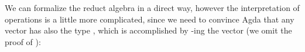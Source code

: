 We can formalize the reduct algebra in a direct way, however the
interpretation of operations is a little more complicated, since we
need to convince Agda that any vector
\AgdaSpace{}\AgdaSymbol{:}%
\AgdaSpace{}\AgdaSpace{}\AgdaSymbol{(}\AgdaSpace{}%
\AgdaUnderscore{}\AgdaSpace{}%
\AgdaSymbol{)} has also
the type \AgdaSpace{}\AgdaSymbol{(}\AgdaSpace{}%
\AgdaSpace{}\AgdaSymbol{)}, which is accomplished by
-ing the vector (we omit the proof of ):
\begin{code}
\>[0]\AgdaSpace{}%
\AgdaSpace{}%
\AgdaSymbol{\{}\AgdaSpace{}%
\AgdaSymbol{\}}\AgdaSpace{}%
\AgdaSymbol{(}\AgdaSpace{}%
\AgdaSymbol{:}\AgdaSpace{}%
\AgdaSpace{}%
\AgdaSpace{}%
\AgdaSymbol{)}\AgdaSpace{}%
\<%
%
\\
\\[\AgdaEmptyExtraSkip]%
%
\>[2]\AgdaSpace{}%
\AgdaSymbol{:}\AgdaSpace{}%
%
\>[13]\AgdaSymbol{(}\AgdaSpace{}%
\AgdaSymbol{:}\AgdaSpace{}%
\AgdaSpace{}%
\AgdaSymbol{)}\AgdaSpace{}%
\AgdaSpace{}%
\AgdaSymbol{(}\AgdaSpace{}%
\AgdaSymbol{:}\AgdaSpace{}%
\AgdaSpace{}%
\AgdaSymbol{)}\AgdaSpace{}%
\AgdaSpace{}%
\AgdaSpace{}%
\AgdaSymbol{\AgdaUnderscore{}}\AgdaSpace{}%
\AgdaSymbol{\AgdaUnderscore{}}\<%
\\
%
\>[2]\AgdaSpace{}%
\AgdaSpace{}%
\AgdaSpace{}%
\AgdaSpace{}%
\AgdaSymbol{=}\AgdaSpace{}%
\AgdaSpace{}%
\AgdaSpace{}%
\AgdaSpace{}%
\AgdaSpace{}%
\AgdaSpace{}%
\<%
%
\\[\AgdaEmptyExtraSkip]%
%
\>[2]\AgdaSpace{}%
\AgdaSymbol{:}%
\>[11]\AgdaSymbol{(}\AgdaSpace{}%
\AgdaSymbol{:}\AgdaSpace{}%
\AgdaSpace{}%
\AgdaSymbol{)}\AgdaSpace{}%

\end{code}
